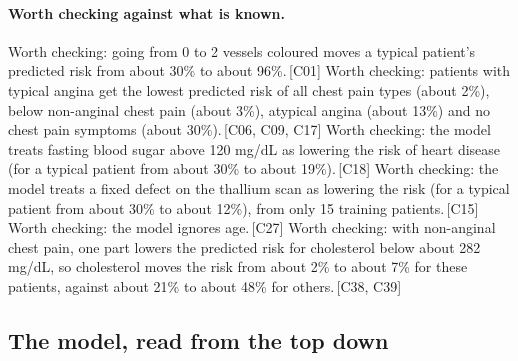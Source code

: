 \documentclass[a4paper,10pt]{article}
\newif\ifreviewmarks
\newcommand{\reviewrule}{\noindent{\color{BrickRed}\rule{\linewidth}{0.8pt}}}
\newenvironment{drafted}[1][]{%
  \ifreviewmarks\par\addvspace{\medskipamount}\reviewrule\par\nopagebreak
  \noindent{\color{BrickRed}\sffamily\footnotesize\textbf{Thesis Draft}\quad #1\hfill review}\par\nopagebreak\smallskip\fi}{%
  \ifreviewmarks\par\smallskip\noindent{\color{BrickRed}\sffamily\footnotesize end of thesis draft}\par\nopagebreak\reviewrule\par\medskip\fi}
\begin{document}
\begin{drafted}[plain-language layer: heart-s2-c3]
\paragraph{Worth checking against what is known.} Worth checking: going from 0 to 2 vessels coloured moves a typical patient's predicted risk from about 30\% to about 96\%.\,{\scriptsize\textcolor{NavyBlue}{[C01]}} Worth checking: patients with typical angina get the lowest predicted risk of all chest pain types (about 2\%), below non-anginal chest pain (about 3\%), atypical angina (about 13\%) and no chest pain symptoms (about 30\%).\,{\scriptsize\textcolor{NavyBlue}{[C06, C09, C17]}} Worth checking: the model treats fasting blood sugar above 120 mg/dL as lowering the risk of heart disease (for a typical patient from about 30\% to about 19\%).\,{\scriptsize\textcolor{NavyBlue}{[C18]}} Worth checking: the model treats a fixed defect on the thallium scan as lowering the risk (for a typical patient from about 30\% to about 12\%), from only 15 training patients.\,{\scriptsize\textcolor{NavyBlue}{[C15]}} Worth checking: the model ignores age.\,{\scriptsize\textcolor{NavyBlue}{[C27]}} Worth checking: with non-anginal chest pain, one part lowers the predicted risk for cholesterol below about 282 mg/dL, so cholesterol moves the risk from about 2\% to about 7\% for these patients, against about 21\% to about 48\% for others.\,{\scriptsize\textcolor{NavyBlue}{[C38, C39]}}
\subsection{The model, read from the top down}

\end{drafted}
\end{document}
